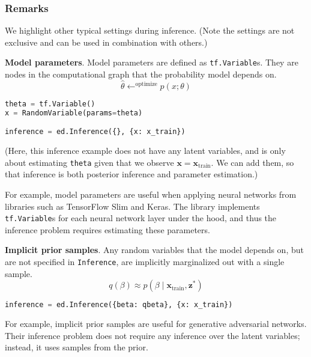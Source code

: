 \subsubsection{Remarks}

We highlight other typical settings during inference. (Note the settings are not exclusive and can be used in combination with others.)

\textbf{Model parameters}.
Model parameters are defined as \texttt{tf.Variable}s. They are
nodes in the computational graph that the probability model
depends on.
\begin{equation*}
\hat{\theta} \leftarrow^{\text{optimize}}
p(x; \theta)
\end{equation*}

\begin{lstlisting}[language=Python]
theta = tf.Variable()
x = RandomVariable(params=theta)

inference = ed.Inference({}, {x: x_train})
\end{lstlisting}
(Here, this inference example does not have any latent variables, and is only about estimating \texttt{theta} given that we observe $\mathbf{x} = \mathbf{x}_{\text{train}}$. We can add them, so that inference is both posterior inference and parameter estimation.)

For example, model parameters are useful when applying neural networks
from libraries such as TensorFlow Slim and Keras. The library
implements \texttt{tf.Variable}s  for each neural network layer under
the hood, and thus the inference problem requires estimating these
parameters.

\textbf{Implicit prior samples}.
Any random variables that the model depends on, but are not specified
in \texttt{Inference}, are implicitly marginalized out with a single
sample.
\begin{equation*}
q(\beta)\approx
p(\beta\mid\mathbf{x}_{\text{train}}, \mathbf{z}^*)
\end{equation*}

\begin{lstlisting}[language=Python]
inference = ed.Inference({beta: qbeta}, {x: x_train})
\end{lstlisting}

For example, implicit prior samples are useful for generative adversarial
networks. Their inference problem does not require any inference over
the latent variables; instead, it uses samples from the prior.
